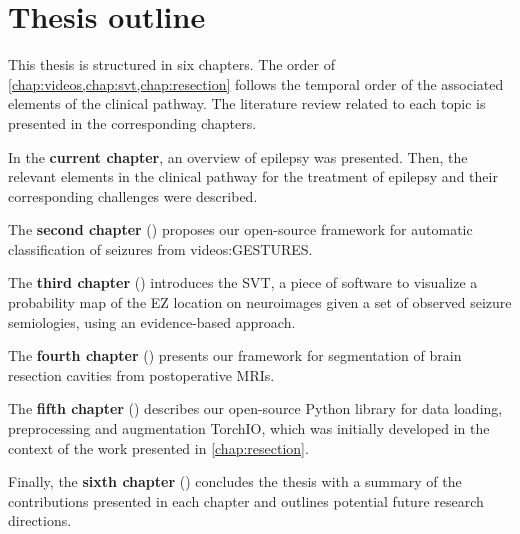 \section{Thesis outline}

This thesis is structured in six chapters.
The order of \cref{chap:videos,chap:svt,chap:resection} follows the temporal order of the associated elements of the clinical pathway.
The literature review related to each topic is presented in the corresponding chapters.

In the \textbf{current chapter}, an overview of epilepsy was presented.
Then, the relevant elements in the clinical pathway for the treatment of epilepsy and their corresponding challenges were described.

The \textbf{second chapter} () proposes our open-source framework for automatic classification of seizures from videos:\linebreak\ac{GESTURES}.

The \textbf{third chapter} () introduces the \ac{SVT}, a piece of software to visualize a probability map of the \ac{EZ} location on neuroimages given a set of observed seizure semiologies, using an evidence-based approach.

The \textbf{fourth chapter} () presents our framework for segmentation of brain resection cavities from postoperative \acp{MRI}.

The \textbf{fifth chapter} () describes our open-source Python library for data loading, preprocessing and augmentation TorchIO, which was initially developed in the context of the work presented in \cref{chap:resection}.

Finally, the \textbf{sixth chapter} () concludes the thesis with a summary of the contributions presented in each chapter and outlines potential future research directions.
